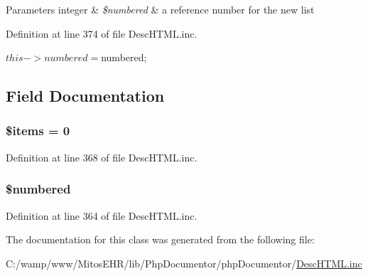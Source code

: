 \begin{DoxyParams}[1]{\-Parameters}
integer & {\em \$numbered} & a reference number for the new list \\
\hline
\end{DoxyParams}


\-Definition at line 374 of file \-Desc\-H\-T\-M\-L.\-inc.


\begin{DoxyCode}
    {
        $this->numbered = $numbered;
    }
\end{DoxyCode}


\subsection{\-Field \-Documentation}
\hypertarget{classparser_list_a737abdef83dabb219182c1e88887c6c3}{
\subsubsection[{\$items}]{\setlength{\rightskip}{0pt plus 5cm}\$items = 0}}\label{classparser_list_a737abdef83dabb219182c1e88887c6c3}


\-Definition at line 368 of file \-Desc\-H\-T\-M\-L.\-inc.

\hypertarget{classparser_list_a6fa8a19fdcf0866a6136484631f37e3e}{
\subsubsection[{\$numbered}]{\setlength{\rightskip}{0pt plus 5cm}\$numbered}}\label{classparser_list_a6fa8a19fdcf0866a6136484631f37e3e}


\-Definition at line 364 of file \-Desc\-H\-T\-M\-L.\-inc.



\-The documentation for this class was generated from the following file\-:\begin{DoxyCompactItemize}
\item 
\-C\-:/wamp/www/\-Mitos\-E\-H\-R/lib/\-Php\-Documentor/php\-Documentor/\hyperlink{_desc_h_t_m_l_8inc}{\-Desc\-H\-T\-M\-L.\-inc}\end{DoxyCompactItemize}

